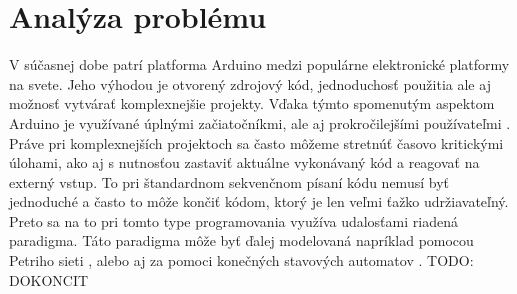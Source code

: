 \section{Analýza problému}
V súčasnej dobe patrí platforma Arduino medzi populárne elektronické platformy na svete. Jeho výhodou je otvorený zdrojový kód, jednoduchosť použitia ale aj možnosť vytvárať komplexnejšie projekty. Vďaka týmto spomenutým aspektom Arduino je využívané úplnými začiatočníkmi, ale aj prokročilejšími používateľmi \cite{WhatArduinoArduino}.
 Práve pri komplexnejších projektoch sa často môžeme stretnúť časovo kritickými 
 úlohami, ako aj s nutnosťou zastaviť aktuálne vykonávaný kód a reagovať na externý vstup. To pri štandardnom sekvenčnom písaní kódu nemusí byť jednoduché a často to môže končiť kódom, ktorý je len veľmi ťažko udržiavateľný. Preto sa na to pri tomto type programovania využíva udalosťami riadená paradigma. Táto paradigma môže byť ďalej modelovaná napríklad pomocou Petriho sieti \cite{bastidePetriNetBased1995}, alebo aj za pomoci konečných stavových automatov \cite{dashEventDrivenProgramming2011}.
 TODO: DOKONCIT 